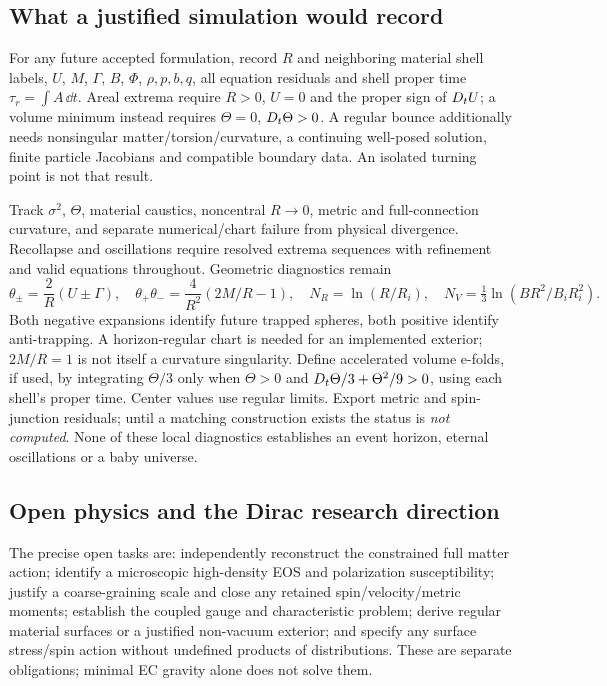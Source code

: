 \subsection{What a justified simulation would record}
For any future accepted formulation, record $R$ and neighboring material shell labels, $U$, $M$, $\Gamma$, $B$, $\Phi$, $\rho,p,b,q$, all equation residuals and shell proper time $\tau_r=\int A\,\dd t$. Areal extrema require $R>0$, $U=0$ and the proper sign of $D_t U$; a volume minimum instead requires $\Theta=0$, $D_t\Theta>0$. A regular bounce additionally needs nonsingular matter/torsion/curvature, a continuing well-posed solution, finite particle Jacobians and compatible boundary data. An isolated turning point is not that result.

Track $\sigma^2$, $\Theta$, material caustics, noncentral $R\to0$, metric and full-connection curvature, and separate numerical/chart failure from physical divergence. Recollapse and oscillations require resolved extrema sequences with refinement and valid equations throughout. Geometric diagnostics remain
\begin{equation}
 \theta_\pm=\frac2R(U\pm\Gamma),\quad
 \theta_+\theta_-=\frac4{R^2}(2M/R-1),\quad
 N_R=\ln(R/R_i),\quad N_V=\tfrac13\ln(BR^2/B_iR_i^2).
\end{equation}
Both negative expansions identify future trapped spheres, both positive identify anti-trapping. A horizon-regular chart is needed for an implemented exterior; $2M/R=1$ is not itself a curvature singularity. Define accelerated volume e-folds, if used, by integrating $\Theta/3$ only when $\Theta>0$ and $D_t\Theta/3+\Theta^2/9>0$, using each shell's proper time. Center values use regular limits. Export metric and spin-junction residuals; until a matching construction exists the status is \emph{not computed}. None of these local diagnostics establishes an event horizon, eternal oscillations or a baby universe.

\subsection{Open physics and the Dirac research direction}
The precise open tasks are: independently reconstruct the constrained full matter action; identify a microscopic high-density EOS and polarization susceptibility; justify a coarse-graining scale and close any retained spin/velocity/metric moments; establish the coupled gauge and characteristic problem; derive regular material surfaces or a justified non-vacuum exterior; and specify any surface stress/spin action without undefined products of distributions. These are separate obligations; minimal EC gravity alone does not solve them.

